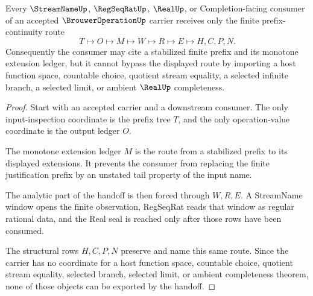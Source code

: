 \begin{theorem}
\label{thm:brouwer-operation-prefix-continuity-handoff}
Every $\StreamNameUp$, $\RegSeqRatUp$, $\RealUp$, or Completion-facing consumer of an accepted $\BrouwerOperationUp$ carrier receives only the finite prefix-continuity route
$$
T \longmapsto O \longmapsto M \longmapsto W \longmapsto R \longmapsto E \longmapsto H,C,P,N.
$$
Consequently the consumer may cite a stabilized finite prefix and its monotone extension ledger, but it cannot bypass the displayed route by importing a host function space, countable choice, quotient stream equality, a selected infinite branch, a selected limit, or ambient $\RealUp$ completeness.
\end{theorem}
\begin{proof}
Start with an accepted carrier and a downstream consumer. The only input-inspection coordinate is the prefix tree $T$, and the only operation-value coordinate is the output ledger $O$.

The monotone extension ledger $M$ is the route from a stabilized prefix to its displayed extensions. It prevents the consumer from replacing the finite justification prefix by an unstated tail property of the input name.

The analytic part of the handoff is then forced through $W,R,E$. A StreamName window opens the finite observation, RegSeqRat reads that window as regular rational data, and the Real seal is reached only after those rows have been consumed.

The structural rows $H,C,P,N$ preserve and name this same route. Since the carrier has no coordinate for a host function space, countable choice, quotient stream equality, selected branch, selected limit, or ambient completeness theorem, none of those objects can be exported by the handoff.
\end{proof}



